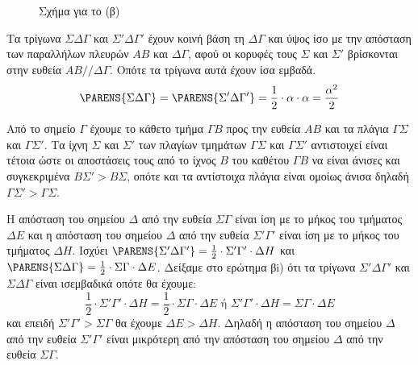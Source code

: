 \begin{alist}
\begin{figure}
\caption*{Σχήμα για το (β)} %
\end{figure}

    \item [β.]
    \begin{rlist}
        \item Τα τρίγωνα $\Sigma\Delta\Gamma$ και $\Sigma'\Delta\Gamma'$ έχουν κοινή βάση τη $\Delta\Gamma$ και ύψος ίσο με την απόσταση των παραλλήλων πλευρών $AB$ και $\Delta\Gamma$, αφού οι κορυφές τους $\Sigma$ και $\Sigma'$ βρίσκονται στην ευθεία $AB // \Delta\Gamma$. Οπότε τα τρίγωνα αυτά έχουν ίσα εμβαδά.
        \[
            \PARENS{\Sigma\Delta\Gamma} = \PARENS{\Sigma'\Delta\Gamma'} = \frac{1}{2} \cdot \alpha \cdot \alpha = \frac{\alpha^2}{2}
        \]
        \item Από το σημείο $\Gamma$ έχουμε το κάθετο τμήμα $\Gamma B$ προς την ευθεία $AB$ και τα πλάγια $\Gamma\Sigma$ και $\Gamma\Sigma'$. Τα ίχνη $\Sigma$ και $\Sigma'$ των πλαγίων τμημάτων $\Gamma\Sigma$ και $\Gamma\Sigma'$ αντιστοιχεί είναι τέτοια ώστε οι αποστάσεις τους από το ίχνος $B$ του καθέτου $\Gamma B$ να είναι άνισες και συγκεκριμένα $B\Sigma' > B\Sigma$, οπότε και τα αντίστοιχα πλάγια είναι ομοίως άνισα δηλαδή $\Gamma\Sigma' > \Gamma\Sigma$.
        \item Η απόσταση του σημείου $\Delta$ από την ευθεία $\Sigma\Gamma$ είναι ίση με το μήκος του τμήματος $\Delta E$ και η απόσταση του σημείου $\Delta$ από την ευθεία $\Sigma'\Gamma'$ είναι ίση με το μήκος του τμήματος $\Delta H$. Ισχύει $\PARENS{\Sigma'\Delta\Gamma'} = \frac{1}{2} \cdot \Sigma'\Gamma' \cdot \Delta H$ και $\PARENS{\Sigma\Delta\Gamma} = \frac{1}{2} \cdot \Sigma\Gamma \cdot \Delta E$.
        Δείξαμε στο ερώτημα βi) ότι τα τρίγωνα $\Sigma'\Delta\Gamma'$ και $\Sigma\Delta\Gamma$ είναι ισεμβαδικά οπότε θα έχουμε:
        \[
            \frac{1}{2} \cdot \Sigma'\Gamma' \cdot \Delta H = \frac{1}{2} \cdot \Sigma\Gamma \cdot \Delta E \text{ ή } \Sigma'\Gamma' \cdot \Delta H = \Sigma\Gamma \cdot \Delta E
        \]
        και επειδή $\Sigma'\Gamma' > \Sigma\Gamma$ θα έχουμε $\Delta E > \Delta H$. Δηλαδή η απόσταση του σημείου $\Delta$ από την ευθεία $\Sigma'\Gamma'$ είναι μικρότερη από την απόσταση του σημείου $\Delta$ από την ευθεία $\Sigma\Gamma$.
    \end{rlist}
\end{alist}